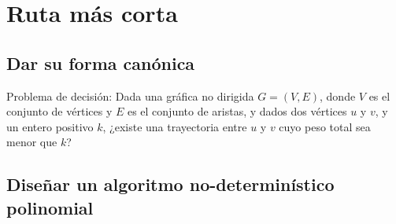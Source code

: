 \section{Ruta más corta}

\subsection{Dar su forma canónica}

Problema de decisión: Dada una gráfica no dirigida $G = (V, E)$, donde $V$ es el conjunto de vértices y $E$ 
es el conjunto de aristas, y dados dos vértices $u$ y $v$, y un entero positivo $k$, ¿existe una trayectoria 
entre $u$ y $v$ cuyo peso total sea menor que $k$?


\subsection{Diseñar un algoritmo no-determinístico polinomial}

